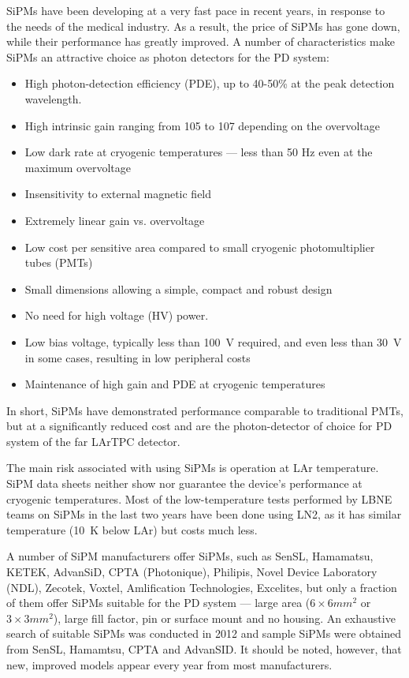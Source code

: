 SiPMs have been developing at a very fast pace in recent years, in
response to the needs of the medical industry. As a result, the price of
SiPMs has gone down, while their performance has greatly
improved. A number of characteristics make SiPMs an
attractive choice as photon detectors for the PD system:

\begin{itemize}

\item{High photon-detection efficiency (PDE), up to 40-50\% at the
  peak detection wavelength. }

\item{High intrinsic gain ranging from 105 to 107 depending on the
  overvoltage}
\item{Low dark rate at cryogenic temperatures --- less than 50 Hz even
  at the maximum overvoltage}
\item{Insensitivity to external magnetic field}
\item{Extremely linear gain vs. overvoltage}
\item{Low cost per sensitive area compared to small cryogenic
  photomultiplier tubes (PMTs)}
\item{Small dimensions allowing a simple, compact and robust design}
\item{No need for high voltage (HV) power.}
\item{Low bias voltage, typically less than 100~V required, and even
  less than 30~V in some cases, resulting in low peripheral costs}
\item{Maintenance of high gain and PDE at cryogenic temperatures}

\end{itemize}

In short, SiPMs have demonstrated performance comparable to
traditional PMTs, but at a significantly reduced cost and %
are the photon-detector of choice for PD system of the far
LArTPC detector.

The main risk associated with using SiPMs is  %
operation at LAr temperature. %
SiPM
data sheets neither show nor guarantee the device's performance at cryogenic
temperatures. %
Most of the low-temperature tests performed by LBNE teams on SiPMs in the last two years have been
done using LN2, as it has similar temperature (10~K below LAr) but
costs much less.

A number of SiPM manufacturers offer SiPMs, such as SenSL,
Hamamatsu, KETEK, AdvanSiD, CPTA (Photonique), Philipis, Novel Device
Laboratory (NDL), Zecotek, Voxtel, Amlification Technologies,
Excelites, %
but only a fraction of them offer SiPMs 
suitable for the PD system --- large area ($6\times6 mm^2$ or $3\times3 mm^2$), large fill
factor, pin or surface mount and no housing. An
exhaustive search of suitable SiPMs was conducted in 2012 and
sample SiPMs were obtained from SenSL, Hamamtsu, CPTA and
AdvanSID. It should be noted, however, that 
new, improved models appear every year from most manufacturers.

